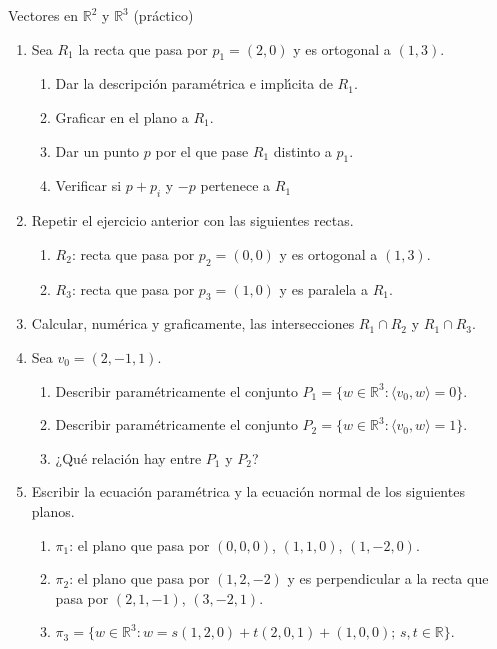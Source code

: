 \begin{chapter}{Vectores en $\mathbb R^2$ y $\mathbb R^3$ (práctico)}
\begin{enumerate}
\item Sea $R_1$ la recta que pasa por $p_1=(2,0)$ y es ortogonal a $(1,3)$.
\begin{enumerate}
 \item Dar la descripci\'on param{\'e}trica e impl{\'\i}cita de $R_1$.
 \item Graficar en el plano a $R_1$.
 \item Dar un punto $p$ por el que pase $R_1$ distinto a $p_1$.
 \item Verificar si $p+p_i$ y $-p$ pertenece a $R_1$
\end{enumerate}

\item Repetir el ejercicio anterior con las siguientes rectas.
\begin{enumerate}
	\item
	$R_2$: recta que pasa por $p_2=(0,0)$ y es ortogonal a $(1,3)$.
	\item
	$R_3$: recta que pasa por $p_3=(1,0)$ y es paralela a $R_1$.
\end{enumerate}


\item Calcular, num\'erica y graficamente, las intersecciones $R_1\cap R_2$ y $R_1\cap R_3$. 


\item Sea $v_0=(2,-1,1)$.
\begin{enumerate}
	\item Describir param{\'e}tricamente el conjunto
	$P_1=\{w\in\mathbb{ R}^3:\langle v_0 , w  \rangle=0\}$.
	\item Describir param{\'e}tricamente el conjunto
	$P_2=\{w\in\mathbb{ R}^3:\langle v_0 , w  \rangle=1\}$.
	\item ¿Qu\'e relaci\'on hay entre $P_1$ y $P_2$?
\end{enumerate}




\item\label{ej-planos} Escribir la ecuaci{\'o}n paramétrica  y la ecuaci{\'o}n normal de los siguientes planos.
\begin{enumerate}
	\item $\pi_1$: el plano que pasa por $(0,0,0)$, $(1,1,0)$, $(1,-2,0)$.
	\item $\pi_2$: el plano que pasa por $(1,2,-2)$ y es perpendicular a la
	recta que pasa por $(2,1,-1)$, $(3,-2,1)$.
	\item\label{ej-planos-c}  $\pi_3=\{w\in\mathbb{R}^3: w=s(1,2,0)+t(2,0,1)+(1,0,0);\,s,t\in \mathbb R\}$.
\end{enumerate}




\end{enumerate}
\end{chapter}
